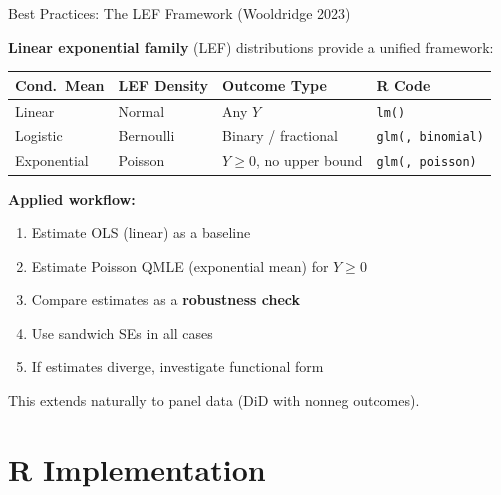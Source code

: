\documentclass[aspectratio=169, handout, t]{beamer}
\numberwithin{equation}{section}
\begin{document}
\begin{frame}{Best Practices: The LEF Framework (Wooldridge 2023)}

\textbf{Linear exponential family} (LEF) distributions provide a unified framework:

\bigskip

\renewcommand{\arraystretch}{1.4}
\begin{tabular}{llll}
\toprule
\textbf{Cond.\ Mean} & \textbf{LEF Density} & \textbf{Outcome Type} & \textbf{R Code} \\
\midrule
Linear & Normal & Any $Y$ & \texttt{lm()} \\
Logistic & Bernoulli & Binary / fractional & \texttt{glm(, binomial)} \\
Exponential & Poisson & $Y \geq 0$, no upper bound & \texttt{glm(, poisson)} \\
\bottomrule
\end{tabular}
\renewcommand{\arraystretch}{1.0}

\pause

\bigskip

\textbf{Applied workflow:}
\begin{enumerate}
    \item Estimate OLS (linear) as a baseline
    \item Estimate Poisson QMLE (exponential mean) for $Y \geq 0$
    \item Compare estimates as a \textbf{robustness check}
    \item Use sandwich SEs in all cases
    \item If estimates diverge, investigate functional form
\end{enumerate}

\pause

\bigskip

This extends naturally to panel data (DiD with nonneg outcomes).

\end{frame}

\section{R Implementation}
\end{document}
